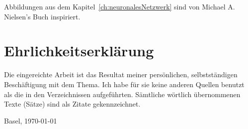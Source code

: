 \documentclass[12pt,a4paper]{report}
\begin{document}
\clearpage
{}
{}
\nocite{*}



\clearpage
{}
{}
\listoffigures
Abbildungen aus dem Kapitel~\ref{ch:neuronalesNetzwerk} sind von Michael A. Nielsen's Buch\cite{neuralbook} inspiriert.

\appendix


\chapter*{Ehrlichkeitserklärung}

Die eingereichte Arbeit ist das Resultat meiner persönlichen, selbstständigen Beschäftigung mit dem Thema.
Ich habe für sie keine anderen Quellen benutzt als die in den Verzeichnissen aufgeführten.
Sämtliche wörtlich übernommenen Texte (Sätze) sind als Zitate gekennzeichnet.

\vspace{2cm}
Basel, \today
\end{document}
